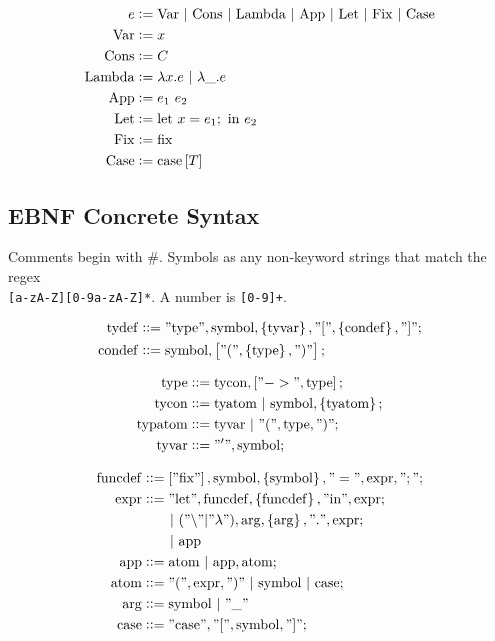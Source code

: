 \documentclass[12pt]{article}
\newcommand{\beq}{::=}
\newcommand{\bs}[1]{\mathrm{#1}}
\newcommand{\bstr}[1]{\mathrm{"#1"}}
\newcommand{\thmlet}[2]{\mathrm{let}~#1~\mathrm{in}~#2}
\newcommand{\thmfix}{\mathrm{fix}}
\newcommand{\thmcase}[1]{\mathrm{case}\sbr{#1}}
\begin{document}
\begin{align}
  e &:= \mathrm{Var} ~|~ \mathrm{Cons} ~|~ \mathrm{Lambda} ~|~ \mathrm{App} ~|~ \mathrm{Let} ~|~ \mathrm{Fix} ~|~ \mathrm{Case}\\
  \mathrm{Var} &:= x\\
  \mathrm{Cons} &:= C\\
  \mathrm{Lambda} &:= \lambda x. e ~|~ \lambda \_. e\\
  \mathrm{App} &:= e_1~e_2\\
  \mathrm{Let} &:= \thmlet{x = e_1;}{e_2}\\
  \mathrm{Fix} &:= \thmfix\\
  \mathrm{Case} &:= \thmcase{T}
\end{align}




\subsection{EBNF Concrete Syntax}
\label{sec:concrete_syntax}

Comments begin with \#.
Symbols as any non-keyword strings that match the regex\\
\verb~[a-zA-Z][0-9a-zA-Z]*~.
A number is \verb~[0-9]+~.

\begin{align}
  \bs{tydef} &\beq \bstr{type}, \bs{symbol}, \cbr{\bs{tyvar}},
               \bstr{[}, \cbr{\bs{condef}}, \bstr{]} ;\\
  \bs{condef} &\beq \bs{symbol}, \sbr{\bstr{(}, \cbr{\bs{type}}, \bstr{)}} ;
\end{align}

\begin{align}
  \bs{type} &\beq \bs{tycon}, \sbr{\bstr{->}, \bs{type}} ;\\
  \bs{tycon} &\beq \bs{tyatom} ~|~ \bs{symbol}, \cbr{\bs{tyatom}} ;\\
  \bs{typatom} &\beq \bs{tyvar} ~|~ \bstr{(}, \bs{type}, \bstr{)} ;\\
  \bs{tyvar} &\beq \bstr{'}, \bs{symbol} ;
\end{align}

\begin{align}
  \bs{funcdef} &\beq \sbr{\bstr{fix}}, \bs{symbol}, \cbr{\bs{symbol}}, \bstr{=}, \bs{expr}, \bstr{;} ;\\
  \bs{expr} &\beq \bstr{let}, \bs{funcdef}, \cbr{\bs{funcdef}}, \bstr{in}, \bs{expr} ;\\
              &\qquad|~ (\bstr{\backslash} | \bstr{\lambda}), \bs{arg}, \cbr{\bs{arg}}, \bstr{.}, \bs{expr} ;\\
                 &\qquad|~ \bs{app}\\
  \bs{app} &\beq \bs{atom} ~|~ \bs{app}, \bs{atom} ;\\
  \bs{atom} &\beq \bstr{(}, \bs{expr}, \bstr{)} ~|~ \bs{symbol} ~|~ \bs{case} ;\\
  \bs{arg} &\beq \bs{symbol} ~|~ \bstr{\_}\\
  \bs{case} &\beq \bstr{case}, \bstr{[}, \bs{symbol}, \bstr{]} ;
\end{align}
\end{document}
